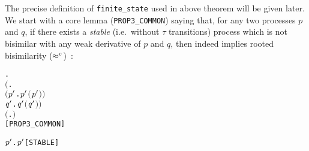 The precise definition of \texttt{finite_state} used in above theorem
will be given later. We start with a core lemma (\texttt{PROP3_COMMON}) saying that, for
any two processes $p$ and $q$, if there exists a \emph{stable}
(i.e.~without $\tau$ transitions)
 process which is not bisimilar with any weak derivative of $p$ and
 $q$, then  indeed implies rooted bisimilarity
 ($\mathrel{\approx^{\rm{c}}}$)~\cite{van2005characterisation,Tian:2017wrba}:
\begin{alltt}
\HOLTokenTurnstile{} \HOLSymConst{\HOLTokenForall{}} .
       \ensuremath{(}\HOLSymConst{\HOLTokenExists{}}.
              \HOLSymConst{\HOLTokenConj{}} \ensuremath{(}\HOLSymConst{\HOLTokenForall{}}\ensuremath{\HOLBoundVar{p}\sp{\prime}} .  \HOLTokenWeakTransBegin{}\HOLTokenWeakTransEnd \ensuremath{\HOLBoundVar{p}\sp{\prime}} \HOLSymConst{\HOLTokenImp{}} \HOLSymConst{\HOLTokenNeg{}}\ensuremath{(}\ensuremath{\HOLBoundVar{p}\sp{\prime}} \HOLSymConst{\HOLTokenWeakEQ} \ensuremath{)}\ensuremath{)} \HOLSymConst{\HOLTokenConj{}}
            \HOLSymConst{\HOLTokenForall{}}\ensuremath{\HOLBoundVar{q}\sp{\prime}} .  \HOLTokenWeakTransBegin{}\HOLTokenWeakTransEnd \ensuremath{\HOLBoundVar{q}\sp{\prime}} \HOLSymConst{\HOLTokenImp{}} \HOLSymConst{\HOLTokenNeg{}}\ensuremath{(}\ensuremath{\HOLBoundVar{q}\sp{\prime}} \HOLSymConst{\HOLTokenWeakEQ} \ensuremath{)}\ensuremath{)} \HOLSymConst{\HOLTokenImp{}}
       \ensuremath{(}\HOLSymConst{\HOLTokenForall{}}.  \HOLSymConst{\ensuremath{+}}  \HOLSymConst{\HOLTokenWeakEQ}  \HOLSymConst{\ensuremath{+}} \ensuremath{)} \HOLSymConst{\HOLTokenImp{}}
        \HOLSymConst{\HOLTokenObsCongr} \hfill{[PROP3_COMMON]}
\end{alltt}
\begin{alltt}
     \HOLTokenDefEquality{} \HOLSymConst{\HOLTokenForall{}} \ensuremath{\HOLBoundVar{p}\sp{\prime}}.  \HOLTokenTransBegin{}\HOLTokenTransEnd \ensuremath{\HOLBoundVar{p}\sp{\prime}} \HOLSymConst{\HOLTokenImp{}}  \HOLSymConst{\HOLTokenNotEqual{}} \HOLSymConst{\ensuremath{\tau}}\hfill{[STABLE]}
\end{alltt}

